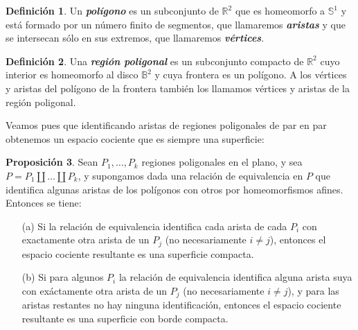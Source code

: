 \documentclass[10pt]{report}
\newcommand{\R}{\mathbb{R}}
\newcommand{\enfatiza}[1]{\textbf{\textit{#1}}}
\theoremstyle{definition}
\newtheorem{defin}{Definición}[section]
\newtheorem{prop}[defin]{Proposición}
\begin{document}
\begin{defin}%
Un \enfatiza{polígono} es un subconjunto de $\R^2$ que es homeomorfo a $\mathbb{S}^1$ y está formado por un número finito de segmentos, que llamaremos \enfatiza{aristas} y que se intersecan sólo en sus extremos, que llamaremos \enfatiza{vértices}. %
\end{defin}

\begin{defin}%

Una \enfatiza{región poligonal} es un subconjunto compacto de $\R^2$ cuyo interior es homeomorfo al disco $\mathbb{B}^2$ y cuya frontera es un polígono.
A los vértices y aristas del polígono de la frontera también los llamamos vértices y aristas de la región poligonal.
\end{defin} 

Veamos pues que identificando aristas de regiones poligonales de par en par obtenemos un espacio cociente que es siempre una superficie:

\begin{prop}%
\label{prop:poligonos}
Sean $P_1,\dots, P_k$ regiones poligonales en el plano, y sea $P=P_1\amalg \dots \amalg P_k$, y supongamos dada una relación de equivalencia en $P$ que identifica algunas aristas de los polígonos con otros por homeomorfismos afines. Entonces se tiene:
\begin{itemize}
\item[(a)] Si la relación de equivalencia identifica cada arista de cada $P_i$ con exactamente otra arista de un $P_j$ (no necesariamente $i\neq j$), entonces el espacio cociente resultante es una superficie compacta.
\item[(b)] Si para algunos $P_i$ la relación de equivalencia identifica alguna arista suya con exáctamente otra arista de un $P_j$ (no necesariamente $i\neq j$), y para las aristas restantes no hay ninguna identificación, entonces el espacio cociente resultante es una superficie con borde compacta.
\end{itemize}
\end{prop}
\end{document}
